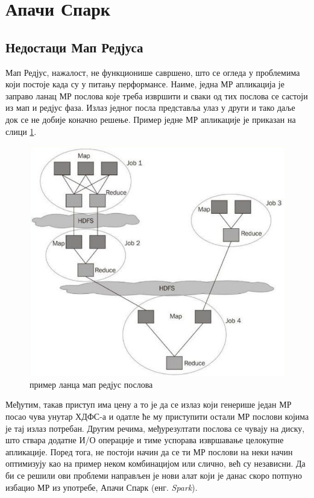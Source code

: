 \documentclass[12pt,oneside]{memoir}
\begin{document}
\section{Апачи Спарк}
\label{sec:spark}

\subsection{Недостаци Мап Редјуса}
\label{subsec:nedost_mr}

Мап Редјус, нажалост, не функционише савршено, што се огледа у проблемима који постоје када су у питању перформансе. Наиме, једна МР апликација је заправо ланац МР послова које треба извршити и сваки од тих послова се састоји из мап и редјус фаза. Излаз једног посла представља улаз у други и тако даље док се не добије коначно решење. Пример једне МР апликације је приказан на слици \ref{fig:mr_app_example}.

\begin{figure}[!ht]
  \centering
  \includegraphics[width=1\textwidth]{pictures/mr_app.png}
  \caption{пример ланца мап редјус послова}
  \label{fig:mr_app_example}
\end{figure}

Међутим, такав приступ има цену а то је да се излаз који генерише један МР посао чува унутар ХДФС-а и одатле ће му приступити остали МР послови којима је тај излаз потребан. Другим речима, међурезултати послова се чувају на диску, што ствара додатне И/О операције и тиме успорава извршавање целокупне апликације. Поред тога, не постоји начин да се ти МР послови на неки начин оптимизују као на пример неком комбинацијом или слично, већ су независни. Да би се решили ови проблеми направљен је нови алат који је данас скоро потпуно избацио МР из употребе, Апачи Спарк (енг. \textit{Spark}). \cite{hadoop_learning}
\end{document}
